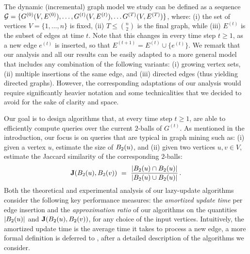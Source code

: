 
\iffalse 



The dynamic (incremental) graph model we study can be defined as a sequence
    ${\mathcal G} = \{ G^{(0)}(V,E^{(0)}), \ldots, G^{(t)}(V,E^{(t)}), \ldots G^{(T)}(V,E^{(T)}) \}$,   where: (i) the set of vertices $V = \{1, \ldots , n \}$ is fixed, (ii) $T \leq \binom{n}{2}$ is the final graph,  while (iii)  $E^{(t)}$ is the subset of edges at time $t$. Note that this  changes in every time step $t \geq 1$, as a new edge $e^{(t)}$ is inserted, so that $E^{(t+1)} = E^{(t)} \cup \{e^{(t)}\} $. 
We remark that  our analysis and all our results can be easily adapted to a more general model that includes any combination of the following variants: (i)  growing vertex sets, (ii)  multiple insertions of the same edge, and (iii) directed edges (thus yielding directed graphs).  However,  the corresponding  adaptations of our analysis  would require  significantly heavier notation and some technicalities that  we decided to avoid for the sake of clarity and space.

Our goal is to design algorithms that, at every time step $t \geq 1$, are able to efficiently compute queries over the current $2$-balls of $G^{(t)}$. As mentioned in the introduction, our focus is on queries that are typical in graph mining such as: (i) given a vertex $u$, estimate the size of $B_2(u)$, and (ii) given two vertices $u,v \in V$, estimate the Jaccard similarity of the corresponding $2$-balls:
\[ 
    \jacc(\ball_2(u),\ball_2(v)) \ = \ \frac{|\ball_2(u) \cap \ball_2(u) |}{|\ball_2(u) \cup \ball_2(u) |}  \, . 
\]
Both the  theoretical  and experimental analysis of  our   lazy-update algorithms  consider the following key performance  measures: the \textit{amortized update time} per edge insertion and the \textit{approximation ratio} of our algorithms on the quantities $|B_2(u)|$ and $\mathbf J(B_2(u),B_2(v))$, for any choice of the input vertices. Intuitively, the amortized update time is the average time it takes to process a new edge, a more formal definition is deferred to , after  a detailed description of the   algorithms  we consider.
    
